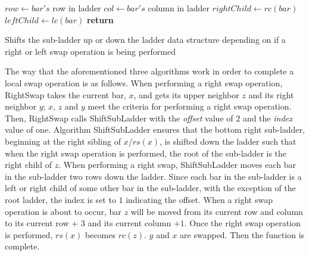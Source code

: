 \begin{algorithm}[!htp]
	\begin{algorithmic}[1]
			\State $row \gets bar's$ row in ladder
			\State $col \gets bar's$ column in ladder
			\State $rightChild \gets rc(bar)$
			\State $leftChild \gets lc(bar)$
				\State \textbf{return}
			\Else 
					\EndIf 
					\EndIf
				\EndIf
					\EndIf 
					\EndIf 
				\EndIf
			\EndIf
		\EndFunction
	\end{algorithmic}
	\caption{Shifts the sub-ladder up or down the ladder data structure depending on if a right or left swap operation is being performed}
	\label{Alg:ShiftSubLadder}
\end{algorithm}\pagebreak


The way that the aforementioned three algorithms work in order 
to complete a local swap operation is as follows. 
When performing a right swap operation, {\sc RightSwap}
takes the current bar, $x$, and gets its upper neighbor $z$ and its right neighbor $y$; $x$, $z$ and $y$ meet the 
criteria for performing a right swap operation. Then, {\sc RightSwap} calls {\sc ShiftSubLadder}
with the \emph{offset} value of $2$ and the \emph{index} value of one. 
Algorithm {\sc ShiftSubLadder} ensures that the bottom right sub-ladder, beginning at the right sibling of $x$/$rs(x)$, 
is shifted down the ladder such that when the right 
swap operation is performed, the root of the sub-ladder is the right child of $z$. 
When performing a right swap, {\sc ShiftSubLadder} moves each bar in the sub-ladder two rows 
down the ladder. Since each bar in the sub-ladder is a left or right child of some other bar in the sub-ladder, 
with the exception of the root ladder, the index is set to $1$ indicating the offset.
When a right swap operation is about to occur, bar $z$ will be moved from its current row and column to its current row + $3$ 
and its current column $+1$. Once the right swap operation is performed, 
$rs(x)$ becomes $rc(z)$. $y$ and $x$ are swapped. Then the function is complete.\par 

